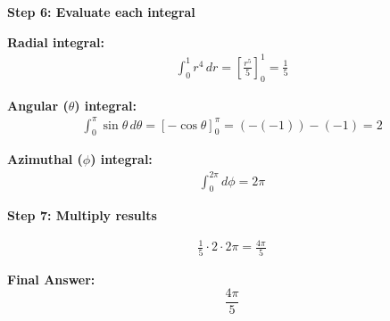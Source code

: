 \begin{examplebox}
    \textbf{Step 6: Evaluate each integral}

    \textbf{Radial integral:}
    \begin{align*}
        \int_0^1 r^4\,dr = \left[\frac{r^5}{5}\right]_0^1 = \frac{1}{5}
    \end{align*}

    \textbf{Angular ($\theta$) integral:}
    \begin{align*}
        \int_0^\pi \sin\theta\,d\theta = [-\cos\theta]_0^\pi = (-(-1)) - (-1) = 2
    \end{align*}

    \textbf{Azimuthal ($\phi$) integral:}
    \begin{align*}
        \int_0^{2\pi} d\phi = 2\pi
    \end{align*}

    \textbf{Step 7: Multiply results}

    \begin{align*}
        \frac{1}{5} \cdot 2 \cdot 2\pi = \frac{4\pi}{5}
    \end{align*}

    \textbf{Final Answer:}
    \[
        \boxed{\frac{4\pi}{5}}
    \]
\end{examplebox}